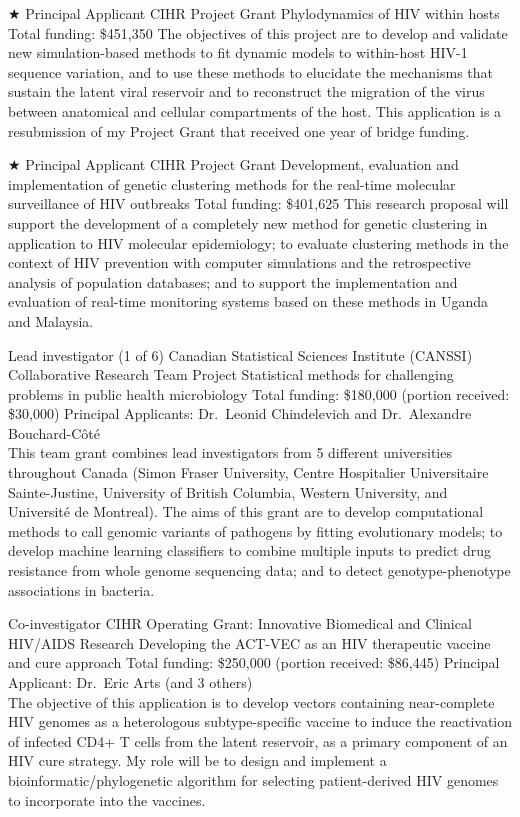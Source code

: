 \documentclass[11pt]{moderncv}
\begin{document}
{$\bigstar$ Principal Applicant}
{CIHR Project Grant} %
{Phylodynamics of HIV within hosts}
{Total funding: \$451,350}
{
The objectives of this project are to develop and validate new simulation-based methods to fit dynamic models to within-host HIV-1 sequence variation, and to use these methods to elucidate the mechanisms that sustain the latent viral reservoir and to reconstruct the migration of the virus between anatomical and cellular compartments of the host.
This application is a resubmission of my Project Grant that received one year of bridge funding.\\ 
}


{$\bigstar$ Principal Applicant}
{CIHR Project Grant} %
{Development, evaluation and implementation of genetic clustering methods for the real-time molecular surveillance of HIV outbreaks}
{Total funding: \$401,625}
{
This research proposal will support the development of a completely new method for genetic clustering in application to HIV molecular epidemiology; 
to evaluate clustering methods in the context of HIV prevention with computer simulations and the retrospective analysis of population databases; 
and to support the implementation and evaluation of real-time monitoring systems based on these methods in Uganda and Malaysia.\\
}


{Lead investigator (1 of 6)}
{Canadian Statistical Sciences Institute (CANSSI) Collaborative Research Team Project}
{Statistical   methods   for   challenging   problems   in   public   health   microbiology}
{Total funding: \$180,000 (portion received: \$30,000)}
{Principal Applicants: Dr.~Leonid Chindelevich and Dr.~Alexandre Bouchard-C\^ot\'e\\
This team grant combines lead investigators from 5 different universities throughout Canada (Simon Fraser University,  Centre Hospitalier Universitaire Sainte-Justine, University of British Columbia, Western University, and Universit\'e de Montreal).
The aims of this grant are to develop computational methods to call genomic variants of pathogens by fitting evolutionary models; to develop machine learning classifiers to combine multiple inputs to predict drug resistance from whole genome sequencing data; and to detect genotype-phenotype associations in bacteria.\\
}

{Co-investigator}
{CIHR Operating Grant: Innovative Biomedical and Clinical HIV/AIDS Research}
{Developing the ACT-VEC as an HIV therapeutic vaccine and cure approach}
{Total funding: \$250,000 (portion received: \$86,445)}
{
Principal Applicant: Dr.~Eric Arts (and 3 others)\\
The objective of this application is to develop vectors containing near-complete HIV genomes as a heterologous subtype-specific vaccine to induce the reactivation of infected CD4+ T cells from the latent reservoir, as a primary component of an HIV cure strategy.
My role will be to design and implement a bioinformatic/phylogenetic algorithm for selecting patient-derived HIV genomes to incorporate into the vaccines.\\
}
\end{document}
